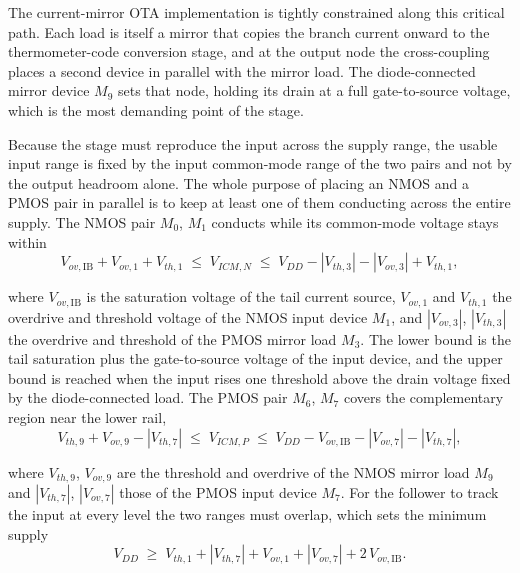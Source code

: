 The current-mirror OTA implementation is tightly constrained along this critical path. Each load is itself a mirror that copies the branch current onward to the thermometer-code conversion stage, and at the output node the cross-coupling places a second device in parallel with the mirror load. The diode-connected mirror device $M_9$ sets that node, holding its drain at a full gate-to-source voltage, which is the most demanding point of the stage.

Because the stage must reproduce the input across the supply range, the usable input range is fixed by the input common-mode range of the two pairs and not by the output headroom alone. The whole purpose of placing an NMOS and a PMOS pair in parallel is to keep at least one of them conducting across the entire supply. The NMOS pair $M_0$, $M_1$ conducts while its common-mode voltage stays within
\begin{equation}
    V_{ov,\mathrm{IB}} + V_{ov,1} + V_{th,1} \;\leq\; V_{ICM,N} \;\leq\; V_{DD} - |V_{th,3}| - |V_{ov,3}| + V_{th,1},
    \label{eq:icmr_n_phase2}
\end{equation}

\noindent
where $V_{ov,\mathrm{IB}}$ is the saturation voltage of the tail current source, $V_{ov,1}$ and $V_{th,1}$ the overdrive and threshold voltage of the NMOS input device $M_1$, and $|V_{ov,3}|$, $|V_{th,3}|$ the overdrive and threshold of the PMOS mirror load $M_3$. The lower bound is the tail saturation plus the gate-to-source voltage of the input device, and the upper bound is reached when the input rises one threshold above the drain voltage fixed by the diode-connected load. The PMOS pair $M_6$, $M_7$ covers the complementary region near the lower rail,
\begin{equation}
    V_{th,9} + V_{ov,9} - |V_{th,7}| \;\leq\; V_{ICM,P} \;\leq\; V_{DD} - V_{ov,\mathrm{IB}} - |V_{ov,7}| - |V_{th,7}|,
    \label{eq:icmr_p_phase2}
\end{equation}

\noindent
where $V_{th,9}$, $V_{ov,9}$ are the threshold and overdrive of the NMOS mirror load $M_9$ and $|V_{th,7}|$, $|V_{ov,7}|$ those of the PMOS input device $M_7$. For the follower to track the input at every level the two ranges must overlap, which sets the minimum supply
\begin{equation}
    V_{DD} \;\geq\; V_{th,1} + |V_{th,7}| + V_{ov,1} + |V_{ov,7}| + 2\,V_{ov,\mathrm{IB}}.
    \label{eq:vddmin_phase2}
\end{equation}

